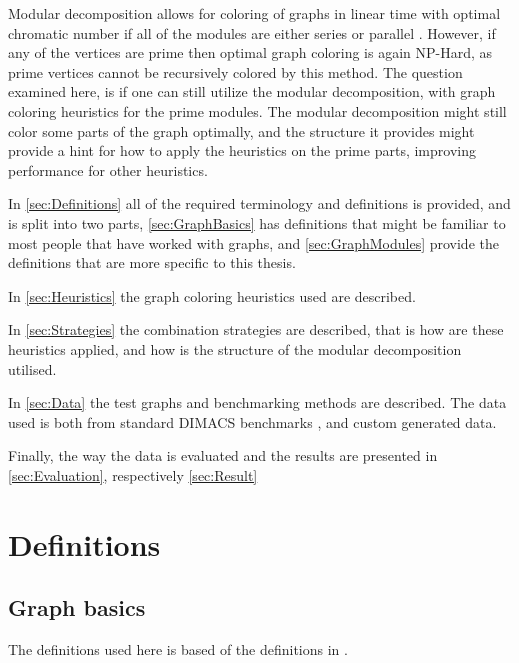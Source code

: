 \documentclass{amsart}
\begin{document}
Modular decomposition allows for coloring of graphs in linear time with optimal
chromatic number if all of the modules are either  series or
parallel \cite{HCL}. However, if any of the vertices are prime then optimal graph coloring 
is again NP-Hard\cite{NPHard}, as prime vertices cannot be recursively colored by this
method. The question examined here, is if one can still utilize the
modular decomposition, with graph coloring heuristics for the prime modules.
The modular decomposition might still color some parts of the graph optimally,
and the structure it provides might provide a hint for how to apply the
heuristics on the prime parts, improving performance for other heuristics.

In \autoref{sec:Definitions} all of the required terminology and definitions is
provided, and is split into two parts, \autoref{sec:GraphBasics} has definitions that might be
familiar to most people that have worked with graphs, and
\autoref{sec:GraphModules} provide the definitions that are more specific to
this thesis.

In \autoref{sec:Heuristics} the graph coloring heuristics used are described.

In \autoref{sec:Strategies} the combination strategies are described, that is how are
these heuristics applied, and how is the structure of the modular decomposition
utilised.

In \autoref{sec:Data} the test graphs and benchmarking methods are described. The data
used is both from standard DIMACS benchmarks \cite{DIMACS}, and custom generated data.

Finally, the way the data is evaluated and the results are presented in 
\autoref{sec:Evaluation}, respectively \autoref{sec:Result}

\section{Definitions}
\label{sec:Definitions}

\subsection{Graph basics}
\label{sec:GraphBasics}

The definitions used here is based of the definitions in 
\cite{GraphBasics}.
\end{document}
